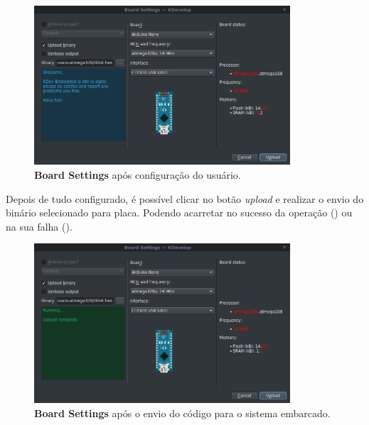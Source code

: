 \begin{figure}[!htb]
  \centering
  \caption[Board Settings após configuração para envio]{\textbf{Board Settings} após configuração do usuário.}
  \label{fig:boardsettingsserial}
  \includegraphics[width=0.85\textwidth]{figuras/boardsettingsSerial.png}
\end{figure}

Depois de tudo configurado, é possível clicar no botão \textit{upload} e realizar o envio do binário selecionado para placa. Podendo acarretar no sucesso da operação () ou na sua falha ().

\begin{figure}[!htb]
  \centering
  \caption[Board Settings com sucesso no envio]{\textbf{Board Settings} após o envio do código para o sistema embarcado.}
  \label{fig:boardsettingsdone}
  \includegraphics[width=0.85\textwidth]{figuras/boardsettingsdone.png}
\end{figure}

